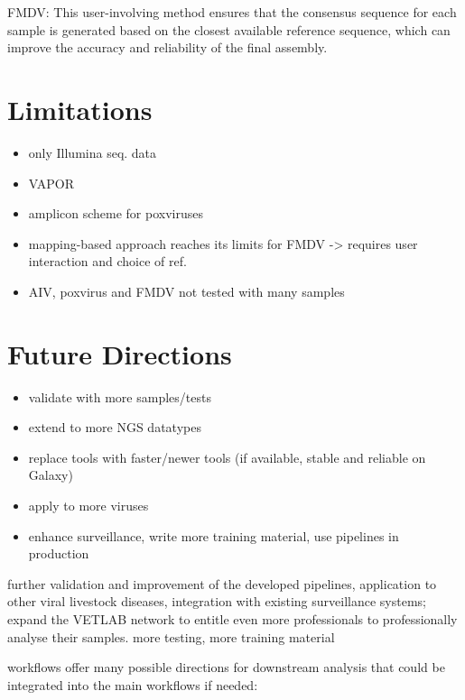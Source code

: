 

FMDV: This user-involving method ensures that the consensus sequence for each sample is generated based on the closest available reference sequence, which can improve the accuracy and reliability of the final assembly. 

\section{Limitations}
\begin{itemize}
    \item only Illumina seq. data
    \item VAPOR 
    \item amplicon scheme for poxviruses
    \item mapping-based approach reaches its limits for FMDV -> requires user interaction and choice of ref. 
    \item AIV, poxvirus and FMDV not tested with many samples
\end{itemize}


\section{Future Directions}
\begin{itemize}
    \item validate with more samples/tests
    \item extend to more NGS datatypes
    \item replace tools with faster/newer tools (if available, stable and reliable on Galaxy)
    \item apply to more viruses
    \item enhance surveillance, write more training material, use pipelines in production
\end{itemize}

further validation and improvement of the developed pipelines, application to other viral livestock diseases, integration with existing surveillance systems; expand the \ac{VETLAB} network to entitle even more professionals to professionally analyse their samples.
more testing, more training material

workflows offer many possible directions for downstream analysis that could be integrated into the main workflows if needed:

